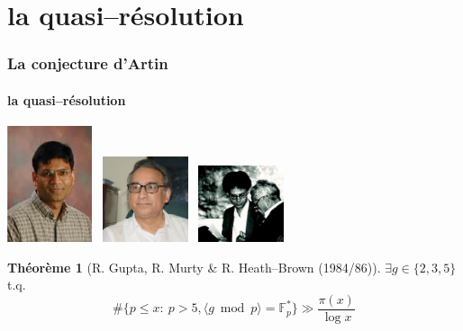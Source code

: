 \documentclass[10pt,handout]{beamer} %
\newcommand{\F}{\mathbb F}
\theoremstyle{definition}
\newtheorem{theoreme}[theorem]{{Th\'eor\`eme}}
\begin{document}
\section{la quasi--r\'esolution}

\begin{frame}\frametitle{La conjecture d'Artin}
\framesubtitle{la quasi--r\'esolution}\pause


\centerline{
\includegraphics[width=2.5cm]{images/gupta.jpg}
\
\includegraphics[width=2.5cm]{images/murty.jpg}
\
\includegraphics[width=2.5cm]{images/heathbrown.jpg}
}\pause


\begin{theoreme}[R. Gupta, R. Murty \& R. Heath--Brown (1984/86)] $\exists g\in\{2,3,5\}$ t.q.
 $$\#\{p\le x:\ p>5, \langle g\bmod p\rangle=\F_p^*\}\gg\frac{\pi(x)}{\log x}$$
\end{theoreme}
\end{frame}
\end{document}
